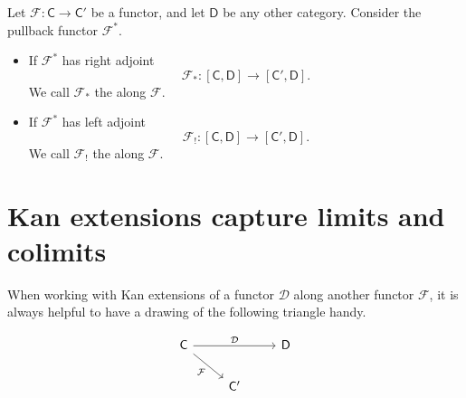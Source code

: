 \documentclass[main.tex]{subfiles}
\begin{document}
\begin{definition}
  \label{def:kan_extension}
  Let $\mathcal{F}\colon \mathsf{C} \to \mathsf{C}'$ be a functor, and let $\mathsf{D}$ be any other category. Consider the pullback functor $\mathcal{F}^{*}$.

  \begin{itemize}
    \item If $\mathcal{F}^{*}$ has right adjoint
      \begin{equation*}
        \mathcal{F}_{*}\colon [\mathsf{C}, \mathsf{D}] \to [\mathsf{C}', \mathsf{D}].
      \end{equation*}
      We call $\mathcal{F}_{*}$ the  along $\mathcal{F}$.

    \item If $\mathcal{F}^{*}$ has left adjoint
      \begin{equation*}
        \mathcal{F}_{!}\colon [\mathsf{C}, \mathsf{D}] \to [\mathsf{C}', \mathsf{D}].
      \end{equation*}
      We call $\mathcal{F}_{!}$ the  along $\mathcal{F}$.
  \end{itemize}
\end{definition}

\section{Kan extensions capture limits and colimits}
\label{sec:kan_extensions_capture_limits_and_colimits}

When working with Kan extensions of a functor $\mathcal{D}$ along another functor $\mathcal{F}$, it is always helpful to have a drawing of the following triangle handy.

\begin{equation*}
  \begin{tikzcd}
    \mathsf{C}
    \arrow[rr, "\mathcal{D}"]
    \arrow[dr, swap, "\mathcal{F}"]
    && \mathsf{D}
    \\
    &\mathsf{C}'
  \end{tikzcd}
\end{equation*}
\end{document}
